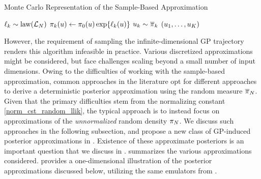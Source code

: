 \documentclass[12pt]{article}
\begin{document}
\begin{algorithm}
    \caption{Monte Carlo Representation of the Sample-Based Approximation}
    \label{alg:sample-approx}
    \begin{algorithmic}[1] %
        		\State $\indexSample{\ell} \sim \law(\llikEm)$ 
		\State $\indexSample{\postDens}(\Par) \gets \priorDens(\Par)\Exp{\indexSample{\ell}(\Par)}$ 
		\State $\indexSample{\Par} \sim \indexSample{\postDensNorm}$ 
	\EndFor
	\State \Return $(\indexSample[1]{\Par}, \dots, \indexSample[\NSample]{\Par})$
	\EndFunction
    \end{algorithmic}
\end{algorithm}

However, the requirement of sampling the infinite-dimensional GP trajectory renders this algorithm infeasible in practice. 
Various discretized approximations might be considered, but face challenges scaling beyond a small number of 
input dimensions. Owing to the difficulties of working with the sample-based approximation, common approaches in the 
literature opt for different approaches to derive a deterministic posterior approximation using the random 
measure $\llikEmRdm[\Ndesign]{\postDensNorm}$. Given that the primary difficulties stem from the normalizing constant
\ref{norm_cst_random_llik}, the typical approach is to instead focus on approximations of the \textit{unnormalized}
random density $\llikEmRdm[\Ndesign]{\postDens}$. We discuss such approaches in the following subsection, and 
propose a new class of GP-induced posterior approximations in . 
Existence of these approximate posteriors is an important question that we discuss in . 
 summarizes the various approximations considered.  provides a 
one-dimensional illustration of the posterior approximations discussed below, utilizing the same emulators 
from .
\end{document}
